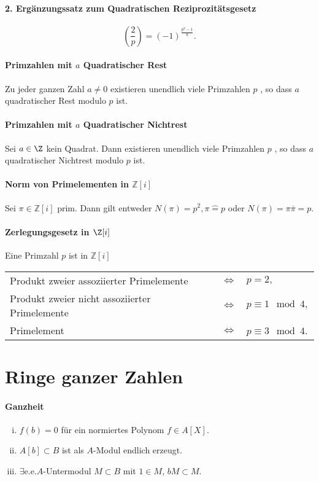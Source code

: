 \documentclass{article}
\begin{document}
\paragraph{2. Ergänzungssatz zum Quadratischen Reziprozitätsgesetz}
$$\left(\frac{2}{p}\right) = (-1)^{\frac{p^2 -1}{8}}.$$

\paragraph{Primzahlen mit $a$ Quadratischer Rest}
Zu jeder ganzen Zahl $a \neq 0$ existieren unendlich viele Primzahlen $p$ , 
so dass $a$ quadratischer Rest modulo $p$ ist.

\paragraph{Primzahlen mit $a$ Quadratischer Nichtrest}
Sei $a \in \Z$ kein Quadrat. Dann existieren unendlich viele Primzahlen $p$ , 
so dass $a$ quadratischer Nichtrest modulo $p$ ist.

\paragraph{Norm von Primelementen in \(\mathbb{Z}[i]\)}
Sei $\pi \in \mathbb{Z}[i]$ prim. Dann gilt entweder $N(\pi) = p^2, \pi \hat = p$ oder $N(\pi) = \pi\overline \pi = p$. 

\paragraph{Zerlegungsgesetz in \(\Z[i]\)}
Eine Primzahl $p$ ist in $\mathbb{Z}[i]$\\
\begin{tabular}{lcl}
    Produkt zweier assoziierter Primelemente & $\Leftrightarrow$ & $p = 2,$\\
    Produkt zweier nicht assoziierter Primelemente & $\Leftrightarrow$ & $p \equiv 1 \mod 4,$\\
    Primelement & $\Leftrightarrow$ & $p \equiv 3 \mod 4$.
\end{tabular}

\section*{Ringe ganzer Zahlen}
\paragraph{Ganzheit}
\begin{enumerate}[(i)]
    \item $f(b) = 0$ für ein normiertes Polynom $f\in A[X]$.
    \item $A[b] \subset B$ ist als $A$-Modul endlich erzeugt.
    \item $\exists \mathrm{e.e.} A$-Untermodul $M \subset B$ mit $1 \in M$, $bM \subset M$.
\end{enumerate}
\end{document}
